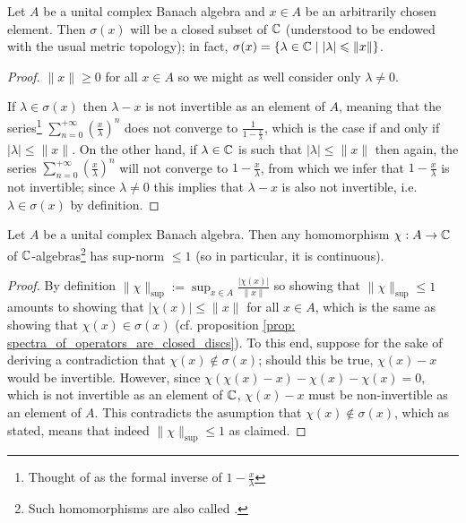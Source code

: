         \begin{proposition} \label{prop: spectra_of_operators_are_closed_discs}
            Let $A$ be a unital complex Banach algebra and $x \in A$ be an arbitrarily chosen element. Then $\sigma(x)$ will be a closed subset of $\mathbb{C}$ (understood to be endowed with the usual metric topology); in fact, $\sigma(x) = \{\lambda \in \mathbb{C} \mid |\lambda| \leqslant \|x\|\}$.
        \end{proposition}
            \begin{proof}
                $\|x\| \geq 0$ for all $x \in A$ so we might as well consider only $\lambda \not = 0$.
                
                If $\lambda \in \sigma(x)$ then $\lambda - x$ is not invertible as an element of $A$, meaning that the series\footnote{Thought of as the formal inverse of $1 - \frac{x}{\lambda}$} $\sum_{n = 0}^{+\infty} \left(\frac{x}{\lambda}\right)^n$ does not converge to $\frac{1}{1 - \frac{x}{\lambda}}$, which is the case if and only if $|\lambda| \leq \|x\|$. On the other hand, if $\lambda \in \mathbb{C}$ is such that $|\lambda| \leq \|x\|$ then again, the series $\sum_{n = 0}^{+\infty} \left(\frac{x}{\lambda}\right)^n$ will not converge to $1 - \frac{x}{\lambda}$, from which we infer that $1 - \frac{x}{\lambda}$ is not invertible; since $\lambda \not = 0$ this implies that $\lambda - x$ is also not invertible, i.e. $\lambda \in \sigma(x)$ by definition. 
            \end{proof}
        \begin{corollary} \label{coro: characters_of_unital_complex_banach_algebras_are_continuous}
            Let $A$ be a unital complex Banach algebra. Then any homomorphism $\chi: A \to \mathbb{C}$ of $\mathbb{C}$-algebras\footnote{Such homomorphisms are also called .} has sup-norm $\leq 1$ (so in particular, it is continuous).
        \end{corollary}
            \begin{proof}
                By definition $\|\chi\|_{\sup} := \sup_{x \in A} \frac{|\chi(x)|}{\|x\|}$ so showing that $\|\chi\|_{\sup} \leq 1$ amounts to showing that $|\chi(x)| \leq \|x\|$ for all $x \in A$, which is the same as showing that $\chi(x) \in \sigma(x)$ (cf. proposition \ref{prop: spectra_of_operators_are_closed_discs}). To this end, suppose for the sake of deriving a contradiction that $\chi(x) \not \in \sigma(x)$; should this be true, $\chi(x) - x$ would be invertible. However, since $\chi(\chi(x) - x) - \chi(x) - \chi(x) = 0$, which is not invertible as an element of $\mathbb{C}$, $\chi(x) - x$ must be non-invertible as an element of $A$. This contradicts the asumption that $\chi(x) \not \in \sigma(x)$, which as stated, means that indeed $\|\chi\|_{\sup} \leq 1$ as claimed.
            \end{proof}
